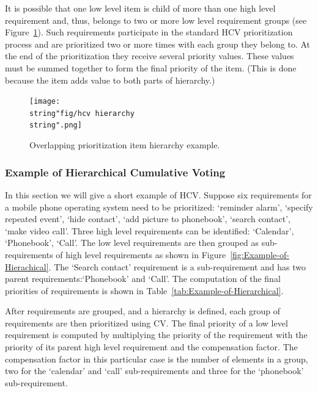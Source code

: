 It is possible that one low level item is child of more than one high
level requirement and, thus, belongs to two or more low level requirement
groups (see Figure~\ref{fig:Overlapping-Prioritization-Item}). Such
requirements participate in the standard HCV prioritization process and
are prioritized two or more times with each group they belong to.
At the end of the prioritization they receive several priority values.
These values must be summed together to form the final priority of the item.
(This is done because the item adds value to both parts of hierarchy.)

\begin{figure}
	\center
\texttt{[image: \\string"fig/hcv hierarchy\\string".png]}
\caption{\label{fig:Overlapping-Prioritization-Item}Overlapping prioritization
item hierarchy example.}
\end{figure}

\subsubsection{Example of Hierarchical Cumulative Voting}
In this section we will give a short example of HCV. Suppose six requirements
for a mobile phone operating system need to be prioritized: `reminder
alarm', `specify repeated event', `hide contact', `add picture to phonebook',
`search contact', `make video call'. Three high level requirements can
be identified: `Calendar', `Phonebook', `Call'. The low level requirements are then
grouped as sub-requirements of high level requirements as shown in
Figure~\ref{fig:Example-of-Hierachical}. The `Search contact' requirement is a 
sub-requirement and has two parent requirements:`Phonebook'
and `Call'. The computation of the final priorities of requirements is shown
in Table~\ref{tab:Example-of-Hierarchical}.

After requirements are grouped, and a hierarchy is defined, each group
of requirements are then prioritized using CV. The final priority of a low level
requirement is computed by multiplying the priority of the requirement
with the priority of its parent high level requirement and the compensation
factor. The compensation factor in this particular case is the number of elements
in a group, two for the `calendar' and `call' sub-requirements and three for
the `phonebook' sub-requirement.

